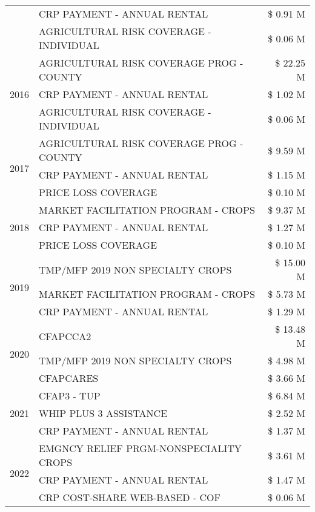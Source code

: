 \begin{tabular}{llr}
 & CRP PAYMENT - ANNUAL RENTAL & \$ 0.91 M \\
 & AGRICULTURAL RISK COVERAGE - INDIVIDUAL & \$ 0.06 M \\
\cline{1-3}
\multirow[t]{3}{*}{2016} & AGRICULTURAL RISK COVERAGE PROG - COUNTY & \$ 22.25 M \\
 & CRP PAYMENT - ANNUAL RENTAL & \$ 1.02 M \\
 & AGRICULTURAL RISK COVERAGE - INDIVIDUAL & \$ 0.06 M \\
\cline{1-3}
\multirow[t]{3}{*}{2017} & AGRICULTURAL RISK COVERAGE PROG - COUNTY & \$ 9.59 M \\
 & CRP PAYMENT - ANNUAL RENTAL & \$ 1.15 M \\
 & PRICE LOSS COVERAGE & \$ 0.10 M \\
\cline{1-3}
\multirow[t]{3}{*}{2018} & MARKET FACILITATION PROGRAM - CROPS & \$ 9.37 M \\
 & CRP PAYMENT - ANNUAL RENTAL & \$ 1.27 M \\
 & PRICE LOSS COVERAGE & \$ 0.10 M \\
\cline{1-3}
\multirow[t]{3}{*}{2019} & TMP/MFP 2019 NON SPECIALTY CROPS & \$ 15.00 M \\
 & MARKET FACILITATION PROGRAM - CROPS & \$ 5.73 M \\
 & CRP PAYMENT - ANNUAL RENTAL & \$ 1.29 M \\
\cline{1-3}
\multirow[t]{3}{*}{2020} & CFAPCCA2 & \$ 13.48 M \\
 & TMP/MFP 2019 NON SPECIALTY CROPS & \$ 4.98 M \\
 & CFAPCARES & \$ 3.66 M \\
\cline{1-3}
\multirow[t]{3}{*}{2021} & CFAP3 - TUP & \$ 6.84 M \\
 & WHIP PLUS 3 ASSISTANCE & \$ 2.52 M \\
 & CRP PAYMENT - ANNUAL RENTAL & \$ 1.37 M \\
\cline{1-3}
\multirow[t]{3}{*}{2022} & EMGNCY RELIEF PRGM-NONSPECIALITY CROPS & \$ 3.61 M \\
 & CRP PAYMENT - ANNUAL RENTAL & \$ 1.47 M \\
 & CRP COST-SHARE WEB-BASED - COF & \$ 0.06 M \\
\cline{1-3}
\bottomrule
\end{tabular}
